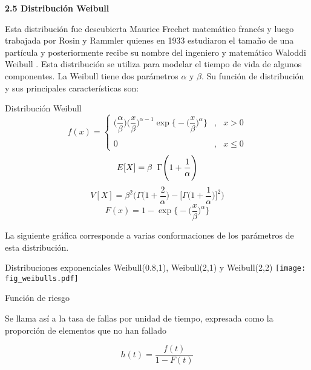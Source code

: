 \documentclass[base=hide,12pt]{elegantbook}
\begin{document}
\vspace{1cm}

\textcolor{col4}{\LARGE  \bf 2.5 Distribución Weibull}\\
\vspace{.5cm}

Esta distribución fue descubierta Maurice Frechet matemático francés y luego trabajada por  Rosin y Rammler quienes en 1933 estudiaron el tamaño de una partícula y posteriormente recibe su nombre del  ingeniero y matemático Waloddi Weibull . Esta distribución se utiliza para modelar el tiempo de vida de algunos componentes. La Weibull tiene dos parámetros $\alpha$ y $\beta$. Su función de distribución y sus principales características son:\\


\begin{Box2}{Distribución Weibull}
	\begin{equation*}
		f(x)=\left\lbrace
		\begin{array}{lll}
			\Bigg(\dfrac{\alpha}{\beta}\Bigg)\Bigg(\dfrac{x}{\beta}\Bigg)^{\alpha-1} \exp{\Bigg\{-\Big(\dfrac{x}{\beta}\Big)^{\alpha}\Bigg\}}	 &,& x > 0   \\
			&&\\
			0 &,& x \leq 0
		\end{array}
		\right.
	\end{equation*}
	$$E[X]=\beta \hspace{.2cm}\Gamma\Bigg(1+\frac{1}{\alpha}\Bigg)$$
	$$V[X]=\beta^{2} \Bigg(\Gamma\Bigg(1+\frac{2}{\alpha}\Bigg)- \Bigg[\Gamma \Bigg(1+\frac{1}{\alpha}\Bigg)\Bigg]^{2}\Bigg) $$
	$$F(x)=1-\exp{\Big\{-\Big(\dfrac{x}{\beta}\Big)^{\alpha}\Big\}} $$	
	
\end{Box2}

La siguiente gráfica corresponde a varias conformaciones de los parámetros de esta distribución.
\begin{center}
	Distribuciones exponenciales \textcolor{col4}{Weibull(0.8,1)}, \textcolor{col5}{Weibull(2,1)} y \textcolor{col3}{Weibull(2,2)}
	\texttt{[image: fig\_weibulls.pdf]}
\end{center}

\begin{Box2}{Función de riesgo} 
	
	Se llama así a la tasa de fallas por unidad de tiempo, expresada como la proporción de elementos que no han fallado

$$h(t)=\dfrac{f(t)}{1-F(t)} $$

\end{Box2}
\end{document}
